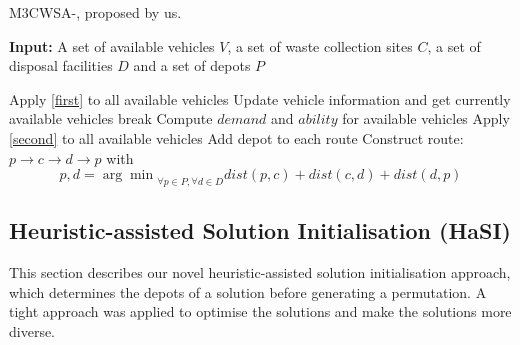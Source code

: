 \documentclass[journal]{IEEEtran}
\begin{document}
\begin{algorithm}[htbp]
	\caption{\label{CWSA2}M3CWSA-\uppercase\expandafter{}, proposed by us.}
	{\bf Input:} A set of available vehicles $V$, a set of waste collection sites $C$, a set of disposal facilities $D$ and a set of depots $P$
	\begin{algorithmic}[1]
		\State Apply \ref{first} to all available vehicles
		\State Update vehicle information and get currently available vehicles
		    \State break
		\EndIf
		\State Compute $demand$ and $ability$ for available vehicles
		\State Apply \ref{second} to all available vehicles
		\EndWhile
		\State Add depot to each route
		\State Construct route: $p\rightarrow c \rightarrow d \rightarrow p$ with $$p,d={\arg\min}_{\forall p\in P, \forall d \in D} {dist(p,c)+dist(c,d)+dist(d,p)}$$
		\EndFor
	\end{algorithmic}
\end{algorithm}

\subsection{Heuristic-assisted Solution Initialisation (HaSI)}\label{sec:hasi}
This section describes our novel heuristic-assisted solution initialisation approach, which determines the depots of a solution before generating a permutation. A tight approach was applied to optimise the solutions and make the solutions more diverse.
\end{document}
